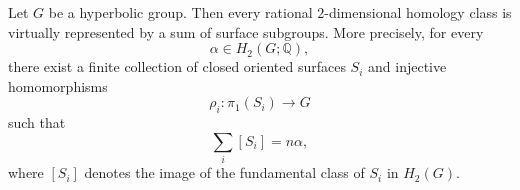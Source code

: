 \begin{conjecture}[D.~Calegari]
Let $G$ be a hyperbolic group. Then every rational $2$-dimensional homology class is virtually represented by a sum of surface subgroups. More precisely, for every
\[
\alpha \in H_2(G;\mathbb{Q}),
\]
there exist a finite collection of closed oriented surfaces $S_i$ and injective homomorphisms
\[
\rho_i : \pi_1(S_i) \to G
\]
such that
\[
\sum_i [S_i] = n\alpha,
\]
where $[S_i]$ denotes the image of the fundamental class of $S_i$ in $H_2(G)$.
\end{conjecture}
